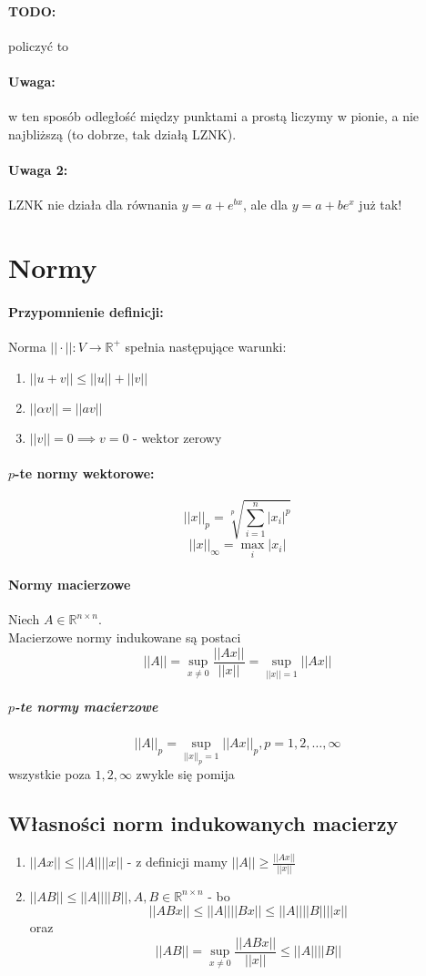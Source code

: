 \documentclass{article}
\begin{document}
\paragraph{TODO:} policzyć to
\paragraph{Uwaga:} w ten sposób odległość między punktami a prostą liczymy w pionie, a nie najbliższą (to dobrze, tak działą LZNK).
\paragraph{Uwaga 2:} LZNK nie działa dla równania $ y=a+e^{bx} $, ale dla $ y=a+be^x $ już tak!
\section{Normy}
\paragraph{Przypomnienie definicji: } Norma $ ||\cdot||: V\rightarrow\mathbb{R}^+$ spełnia następujące warunki:
\begin{enumerate}
	\item $||u+v||\leq||u||+||v||$
	\item $||\alpha v||=||av||$
	\item $||v||=0\implies v=0$ - wektor zerowy
\end{enumerate}
\paragraph{$p$-te normy wektorowe:}
$$||x||_p = \sqrt[p]{\sum_{i=1}^{n}|x_i|^p}$$
$$||x||_\infty = \max_i |x_i|$$
\paragraph{Normy macierzowe}
Niech $A\in \mathbb{R}^{n\times n}$.\\
Macierzowe normy indukowane są postaci
$$||A||=\sup_{x\not=0}\frac{||Ax||}{||x||}=\sup_{||x||=1}||Ax||$$
\subparagraph{$p$-te normy macierzowe}
$$||A||_p=\sup_{||x||_p=1}||Ax||_p, p=1, 2, \ldots, \infty$$
wszystkie poza $1, 2, \infty$ zwykle się pomija
\subsection{Własności norm indukowanych macierzy}
\begin{enumerate}
	\item $||Ax||\leq||A||||x||$ - z definicji mamy $ ||A||\geq\frac{||Ax||}{||x||} $
	\item $ ||AB||\leq||A||||B||, A,B\in \mathbb{R}^{n\times n} $ - bo 
	$$ ||ABx||\leq||A||||Bx||\leq||A||||B||||x|| $$ oraz 
	$$ ||AB||=\sup_{x\not=0}\frac{||ABx||}{||x||}\leq||A||||B|| $$
\end{enumerate}
\end{document}
